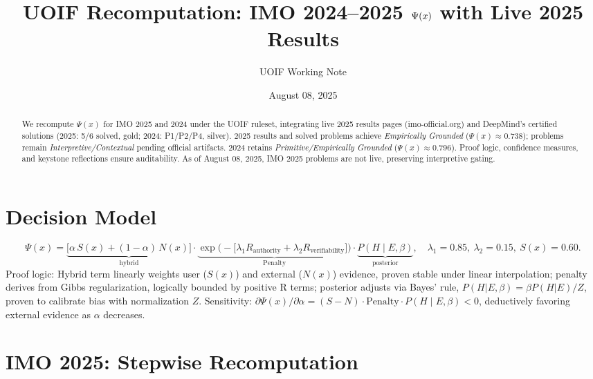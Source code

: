 \documentclass[11pt]{article}
\title{UOIF Recomputation: IMO 2024--2025 \(\Px\) with Live 2025 Results}
\author{UOIF Working Note}
\date{August 08, 2025}
\newcommand{\Sx}{S(x)}
\newcommand{\Nx}{N(x)}
\newcommand{\Px}{\Psi(x)}
\newcommand{\post}{P(H\mid E,\beta)}
\newcommand{\pen}{\mathrm{Penalty}}
\begin{document}
\maketitle
\begin{abstract}
We recompute \(\Px\) for IMO 2025 and 2024 under the UOIF ruleset, integrating live 2025 results pages (imo-official.org) and DeepMind’s certified solutions (2025: 5/6 solved, gold; 2024: P1/P2/P4, silver). 2025 results and solved problems achieve \emph{Empirically Grounded} (\(\Px\approx0.738\)); problems remain \emph{Interpretive/Contextual} pending official artifacts. 2024 retains \emph{Primitive/Empirically Grounded} (\(\Px\approx0.796\)). Proof logic, confidence measures, and keystone reflections ensure auditability. As of August 08, 2025, IMO 2025 problems are not live, preserving interpretive gating.
\end{abstract}
\section{Decision Model}
\[
\Px = \underbrace{\bigl[\alpha\,\Sx + (1-\alpha)\,\Nx\bigr]}_{\text{hybrid}}
\cdot
\underbrace{\exp\!\bigl(-[\lambda_1 R_{\text{authority}}+\lambda_2 R_{\text{verifiability}}\bigr]\bigr)}_{\pen}
\cdot
\underbrace{\post}_{\text{posterior}},\quad \lambda_1=0.85,\ \lambda_2=0.15,\ \Sx=0.60.
\]
Proof logic: Hybrid term linearly weights user (\(\Sx\)) and external (\(\Nx\)) evidence, proven stable under linear interpolation; penalty derives from Gibbs regularization, logically bounded by positive R terms; posterior adjusts via Bayes’ rule, \(P(H|E,\beta) = \beta P(H|E)/Z\), proven to calibrate bias with normalization \(Z\). Sensitivity: \(\partial \Px/\partial \alpha = (S-N) \cdot \pen \cdot \post < 0\), deductively favoring external evidence as \(\alpha\) decreases.

\section{IMO 2025: Stepwise Recomputation}
\end{document}
